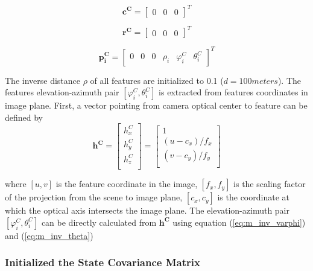 \begin{equation}
\mathbf{c^{C}}=\begin{bmatrix}0&0&0\end{bmatrix}^T
\end{equation}

\begin{equation}
\mathbf{r^{C}}=\begin{bmatrix}0&0&0\end{bmatrix}^T
\end{equation}

\begin{equation}
\label{eq:pi_init}
\mathbf{p_{i}^{C}}=\begin{bmatrix}0&0&0&\rho _{i}&\varphi_{i}^C&\theta_{i}^C\end{bmatrix}^T
\end{equation}

The inverse distance $\rho$ of all features are initialized to 0.1
($d=100 meters$). The features elevation-azimuth pair $[\varphi _{i}^{C},
\theta _{i}^{C}]$ is extracted from features coordinates in image
plane. First, a vector pointing from camera optical center to feature
can be defined by
\begin{equation}
\label{eq:init_feature_unit_vec}
\mathbf{h^{C}}=\begin{bmatrix}
h_{x}^{C}\\
h_{y}^{C}\\
h_{z}^{C}\\
\end{bmatrix}
 = \begin{bmatrix}
1 \\
(u-c_x)/f_{x} \\
(v-c_y)/f_{y} \\
\end{bmatrix}
\end{equation}

\noindent where $[u, v]$ is the feature coordinate in the image, $
[f_{x}, f_{y}]$ is the scaling factor of the projection from the scene
to image plane, $[c_x, c_y]$ is the coordinate at which the optical axis
intersects the image plane. The elevation-azimuth pair $[\varphi
_{i}^{C}, \theta _{i}^{C}]$ can be directly calculated from
$\mathbf{h^{C}}$ using equation (\ref{eq:m_inv_varphi}) and (\ref{eq:m_inv_theta})

\subsubsection{Initialized the State Covariance Matrix}

